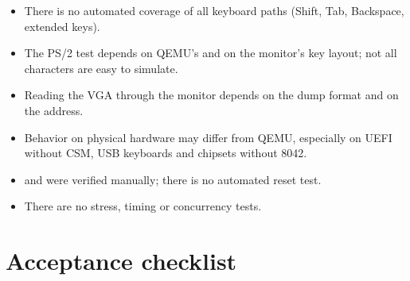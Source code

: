 \begin{itemize}
  \item There is no automated coverage of all keyboard paths
        (Shift, Tab, Backspace, extended keys).
  \item The PS/2 test depends on QEMU's  and on the monitor's
        key layout; not all characters are easy to simulate.
  \item Reading the VGA through the monitor depends on the dump format and on
        the  address.
  \item Behavior on physical hardware may differ from QEMU,
        especially on UEFI without CSM, USB keyboards and chipsets without 8042.
  \item {} and  were verified manually; there is no
        automated reset test.
  \item There are no stress, timing or concurrency tests.
\end{itemize}

\section{Acceptance checklist}

